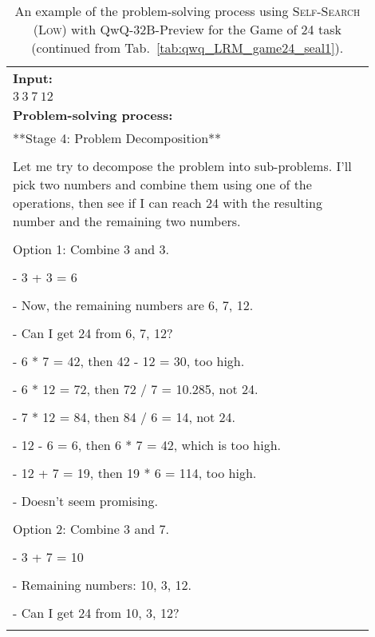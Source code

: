 \begin{table*}[ht]
\small
\centering
\caption{An example of the problem-solving process using \textsc{Self-Search (Low)} with QwQ-32B-Preview for the Game of 24 task (continued from Tab.~\ref{tab:qwq_LRM_game24_seal1}).}
\begin{tabular}{p{0.9\linewidth}} \toprule
\textbf{Input: }\\
$3\ 3\ 7\ 12$\\
\midrule
\textbf{Problem-solving process:}\\
**Stage 4: Problem Decomposition**\\
\\
Let me try to decompose the problem into sub-problems. I'll pick two numbers and combine them using one of the operations, then see if I can reach 24 with the resulting number and the remaining two numbers.\\
\\
Option 1: Combine 3 and 3.\\
\\
- 3 + 3 = 6\\
\\
- Now, the remaining numbers are 6, 7, 12.\\
\\
- Can I get 24 from 6, 7, 12?\\
\\
- 6 * 7 = 42, then 42 - 12 = 30, too high.\\
\\
- 6 * 12 = 72, then 72 / 7 = 10.285, not 24.\\
\\
- 7 * 12 = 84, then 84 / 6 = 14, not 24.\\
\\
- 12 - 6 = 6, then 6 * 7 = 42, which is too high.\\
\\
- 12 + 7 = 19, then 19 * 6 = 114, too high.\\
\\
- Doesn't seem promising.\\
\\
Option 2: Combine 3 and 7.\\
\\
- 3 + 7 = 10\\
\\
- Remaining numbers: 10, 3, 12.\\
\\
- Can I get 24 from 10, 3, 12?\\
\\

\end{tabular}
\end{table*}
